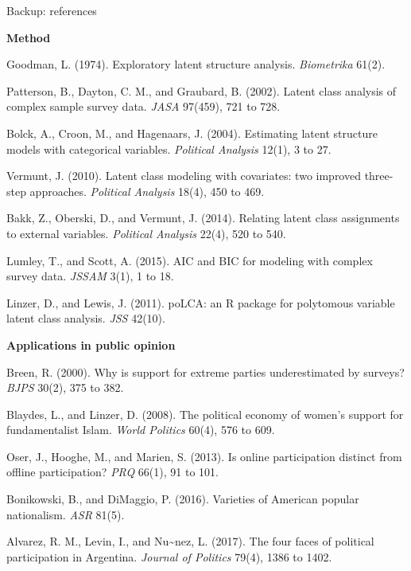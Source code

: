 \documentclass[
  ignorenonframetext,
  aspectratio=169,
]{beamer}
\newcommand{\kicker}[1]{\par\noindent{\footnotesize\color{vteal}\textbf{\MakeUppercase{#1}}}\par\vspace{0.4em}}
\begin{document}
\begin{frame}[shrink]{Backup: references}
\label{backup-references}
\kicker{sources cited}

\scriptsize

\textbf{Method}

Goodman, L. (1974). Exploratory latent structure analysis.
\emph{Biometrika} 61(2).

Patterson, B., Dayton, C. M., and Graubard, B. (2002). Latent class
analysis of complex sample survey data. \emph{JASA} 97(459), 721 to 728.

Bolck, A., Croon, M., and Hagenaars, J. (2004). Estimating latent
structure models with categorical variables. \emph{Political Analysis}
12(1), 3 to 27.

Vermunt, J. (2010). Latent class modeling with covariates: two improved
three-step approaches. \emph{Political Analysis} 18(4), 450 to 469.

Bakk, Z., Oberski, D., and Vermunt, J. (2014). Relating latent class
assignments to external variables. \emph{Political Analysis} 22(4), 520
to 540.

Lumley, T., and Scott, A. (2015). AIC and BIC for modeling with complex
survey data. \emph{JSSAM} 3(1), 1 to 18.

Linzer, D., and Lewis, J. (2011). poLCA: an R package for polytomous
variable latent class analysis. \emph{JSS} 42(10).

\textbf{Applications in public opinion}

Breen, R. (2000). Why is support for extreme parties underestimated by
surveys? \emph{BJPS} 30(2), 375 to 382.

Blaydes, L., and Linzer, D. (2008). The political economy of women's
support for fundamentalist Islam. \emph{World Politics} 60(4), 576 to
609.

Oser, J., Hooghe, M., and Marien, S. (2013). Is online participation
distinct from offline participation? \emph{PRQ} 66(1), 91 to 101.

Bonikowski, B., and DiMaggio, P. (2016). Varieties of American popular
nationalism. \emph{ASR} 81(5).

Alvarez, R. M., Levin, I., and N\textquotesingle u\textasciitilde nez,
L. (2017). The four faces of political participation in Argentina.
\emph{Journal of Politics} 79(4), 1386 to 1402.

\end{frame}
\end{document}

